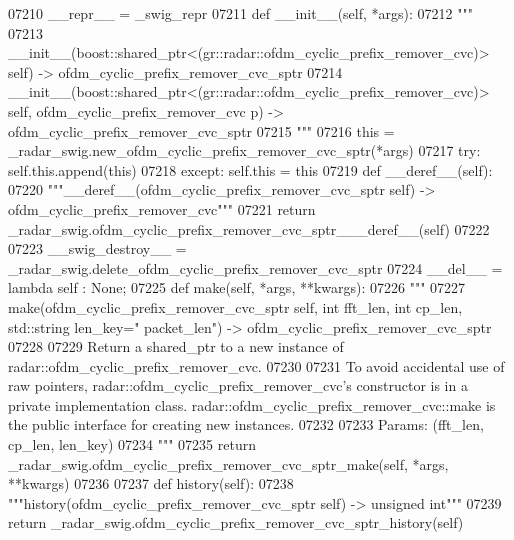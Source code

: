 \begin{DoxyCode}
{{{{{{{{{{{{{{{{{{{{{{{{07210     \_\_repr\_\_ = \_swig\_repr
07211     \textcolor{keyword}{def }__init__(self, *args): 
07212         \textcolor{stringliteral}{"""}
07213 \textcolor{stringliteral}{        \_\_init\_\_(boost::shared\_ptr<(gr::radar::ofdm\_cyclic\_prefix\_remover\_cvc)> self) ->
       ofdm\_cyclic\_prefix\_remover\_cvc\_sptr}
07214 \textcolor{stringliteral}{        \_\_init\_\_(boost::shared\_ptr<(gr::radar::ofdm\_cyclic\_prefix\_remover\_cvc)> self,
       ofdm\_cyclic\_prefix\_remover\_cvc p) -> ofdm\_cyclic\_prefix\_remover\_cvc\_sptr}
07215 \textcolor{stringliteral}{        """}
07216         this = \_radar\_swig.new\_ofdm\_cyclic\_prefix\_remover\_cvc\_sptr(*args)
07217         \textcolor{keywordflow}{try}: self.this.append(this)
07218         \textcolor{keywordflow}{except}: self.this = this
07219     \textcolor{keyword}{def }__deref__(self):
07220         \textcolor{stringliteral}{"""\_\_deref\_\_(ofdm\_cyclic\_prefix\_remover\_cvc\_sptr self) -> ofdm\_cyclic\_prefix\_remover\_cvc"""}
07221         \textcolor{keywordflow}{return} \_radar\_swig.ofdm\_cyclic\_prefix\_remover\_cvc\_sptr\_\_\_deref\_\_(self)
07222 
07223     \_\_swig\_destroy\_\_ = \_radar\_swig.delete\_ofdm\_cyclic\_prefix\_remover\_cvc\_sptr
07224     \_\_del\_\_ = \textcolor{keyword}{lambda} self : \textcolor{keywordtype}{None};
07225     \textcolor{keyword}{def }make(self, *args, **kwargs):
07226         \textcolor{stringliteral}{"""}
07227 \textcolor{stringliteral}{        make(ofdm\_cyclic\_prefix\_remover\_cvc\_sptr self, int fft\_len, int cp\_len, std::string len\_key="
      packet\_len") -> ofdm\_cyclic\_prefix\_remover\_cvc\_sptr}
07228 \textcolor{stringliteral}{}
07229 \textcolor{stringliteral}{        Return a shared\_ptr to a new instance of radar::ofdm\_cyclic\_prefix\_remover\_cvc.}
07230 \textcolor{stringliteral}{}
07231 \textcolor{stringliteral}{        To avoid accidental use of raw pointers, radar::ofdm\_cyclic\_prefix\_remover\_cvc's constructor is in
       a private implementation class. radar::ofdm\_cyclic\_prefix\_remover\_cvc::make is the public interface for
       creating new instances.}
07232 \textcolor{stringliteral}{}
07233 \textcolor{stringliteral}{        Params: (fft\_len, cp\_len, len\_key)}
07234 \textcolor{stringliteral}{        """}
07235         \textcolor{keywordflow}{return} \_radar\_swig.ofdm\_cyclic\_prefix\_remover\_cvc\_sptr\_make(self, *args, **kwargs)
07236 
07237     \textcolor{keyword}{def }history(self):
07238         \textcolor{stringliteral}{"""history(ofdm\_cyclic\_prefix\_remover\_cvc\_sptr self) -> unsigned int"""}
07239         \textcolor{keywordflow}{return} \_radar\_swig.ofdm\_cyclic\_prefix\_remover\_cvc\_sptr\_history(self)
}}}}}}}}}}}}}}}}}}}}}}}}
\end{DoxyCode}
